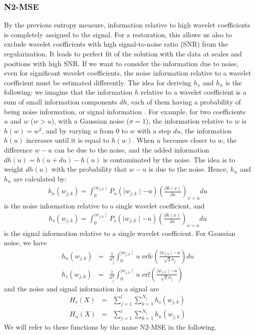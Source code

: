 \subsubsection{N2-MSE}

By the previous  entropy measure, information relative to high wavelet coefficients is  
completely assigned to the signal. For a restoration, this allows us 
also to exclude
wavelet coefficients with high signal-to-noise ratio (SNR)
from the regularization.
It leads to perfect fit of the solution with the data at scales and
 positions with high SNR. If we want to consider the information due
to noise, even for significant wavelet coefficients, the noise information
relative to a wavelet coefficient must be estimated differently.
 The idea for deriving $h_s$ and $h_n$ is the following: we imagine that  the
information $h$ relative to a wavelet coefficient 
is a sum of small information components $dh$, each of them
having a probability of being noise information, or signal 
information \cite{starck:sta98_2}. 
For example, 
for two coefficients  $u$ and  $w$ ($w > u$), with a Gaussian noise
($\sigma=1$), the information relative to $w$ is $h(w)=w^2$, and by
varying  $u$ from $0$  to $w$ with a step $du$, the information $h(u)$ 
increases until it is equal to $h(w)$. 
 When $u$ becomes closer to $w$,
the difference $w - u$ can be due to the noise, and the added information  
$dh(u) = h(u+du) - h(u)$ is contaminated by the noise. The idea is to weight
$dh(u)$ with the probability that $w - u$ is due to the noise.
Hence, $h_n$ and $h_n$ are calculated by:
\begin{eqnarray}
h_n(w_{j,k}) =  \int_{0}^{\mid w_{j,k} \mid } P_n(\mid w_{j,k} \mid - u) (\frac{\partial h(x)}{\partial x})_{x=u} du
\end{eqnarray}
is the noise information relative to a single wavelet coefficient, and 
\begin{eqnarray}
h_s(w_{j,k}) =  \int_{0}^{\mid w_{j,k} \mid } P_s(\mid w_{j,k} \mid - u) 
                                   (\frac{\partial h(x)}{\partial x})_{x=u} du
\end{eqnarray}
is the signal information relative to a single wavelet coefficient. 
For Gaussian noise, we have
\begin{eqnarray}
h_n(w_{j,k}) & = &  \frac{1}{\sigma_j^2} \int_{0}^{\mid w_{j,k} \mid} u 
         \mbox{ erfc}(\frac{\mid w_{j,k} \mid -u}{\sqrt{2} \sigma_j}) du \nonumber \\
h_s(w_{j,k}) & = &  \frac{1}{\sigma_j^2} \int_{0}^{\mid w_{j,k} \mid} u 
         \mbox{ erf}(\frac{\mid w_{j,k} \mid -u}{\sqrt{2} \sigma_j})
\label{eqn_hn2}
\end{eqnarray}
and the noise and signal information in a signal are
\begin{eqnarray}
H_s(X) & = & \sum_{j=1}^{l} \sum_{k=1}^{N_j} h_s(w_{j,k})   \nonumber \\  
H_n(X) & = & \sum_{j=1}^{l} \sum_{k=1}^{N_j} h_n(w_{j,k})     
\label{eq_entrop_gauss_result_2}
\end{eqnarray}
We will refer to these functions by the name N2-MSE in the following.


